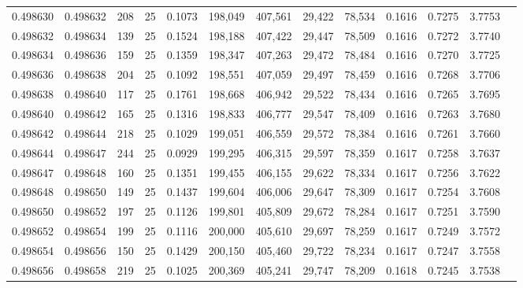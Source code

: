 \begin{tabular}{rrrrrrrrrrrrr}
0.498630 & 0.498632 & 208 &  25 &                                     0.1073 & 198,049 & 407,561 &  29,422 &  78,534 & 0.1616 & 0.7275 & 3.7753 \\
0.498632 & 0.498634 & 139 &  25 &                                     0.1524 & 198,188 & 407,422 &  29,447 &  78,509 & 0.1616 & 0.7272 & 3.7740 \\
0.498634 & 0.498636 & 159 &  25 &                                     0.1359 & 198,347 & 407,263 &  29,472 &  78,484 & 0.1616 & 0.7270 & 3.7725 \\
0.498636 & 0.498638 & 204 &  25 &                                     0.1092 & 198,551 & 407,059 &  29,497 &  78,459 & 0.1616 & 0.7268 & 3.7706 \\
0.498638 & 0.498640 & 117 &  25 &                                     0.1761 & 198,668 & 406,942 &  29,522 &  78,434 & 0.1616 & 0.7265 & 3.7695 \\
0.498640 & 0.498642 & 165 &  25 &                                     0.1316 & 198,833 & 406,777 &  29,547 &  78,409 & 0.1616 & 0.7263 & 3.7680 \\
0.498642 & 0.498644 & 218 &  25 &                                     0.1029 & 199,051 & 406,559 &  29,572 &  78,384 & 0.1616 & 0.7261 & 3.7660 \\
0.498644 & 0.498647 & 244 &  25 &                                     0.0929 & 199,295 & 406,315 &  29,597 &  78,359 & 0.1617 & 0.7258 & 3.7637 \\
0.498647 & 0.498648 & 160 &  25 &                                     0.1351 & 199,455 & 406,155 &  29,622 &  78,334 & 0.1617 & 0.7256 & 3.7622 \\
0.498648 & 0.498650 & 149 &  25 &                                     0.1437 & 199,604 & 406,006 &  29,647 &  78,309 & 0.1617 & 0.7254 & 3.7608 \\
0.498650 & 0.498652 & 197 &  25 &                                     0.1126 & 199,801 & 405,809 &  29,672 &  78,284 & 0.1617 & 0.7251 & 3.7590 \\
0.498652 & 0.498654 & 199 &  25 &                                     0.1116 & 200,000 & 405,610 &  29,697 &  78,259 & 0.1617 & 0.7249 & 3.7572 \\
0.498654 & 0.498656 & 150 &  25 &                                     0.1429 & 200,150 & 405,460 &  29,722 &  78,234 & 0.1617 & 0.7247 & 3.7558 \\
0.498656 & 0.498658 & 219 &  25 &                                     0.1025 & 200,369 & 405,241 &  29,747 &  78,209 & 0.1618 & 0.7245 & 3.7538 \\

\end{tabular}
